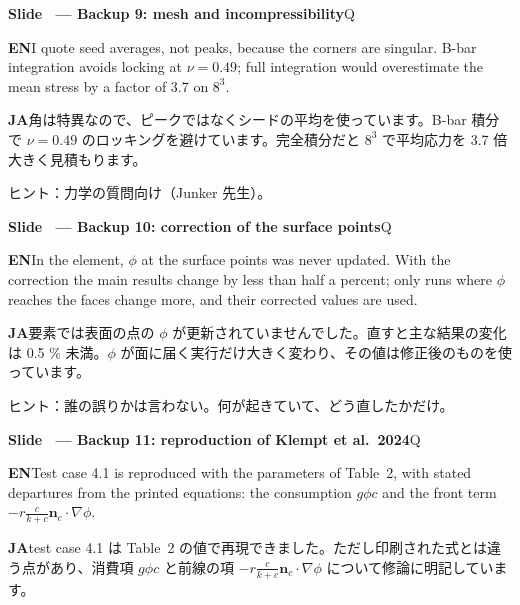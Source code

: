 \documentclass[11pt,a4paper]{article}
\newcounter{sl}
\newcommand{\slide}[2]{\stepcounter{sl}\vspace{8pt}%
  {\color{c3}\large\bfseries Slide \thesl\ --- #1}\hfill{\small #2}\par\vspace{2pt}}
\newcommand{\EN}{\textbf{EN}\quad}
\newcommand{\JA}{\par\textbf{JA}\quad}
\newcommand{\hint}[1]{\par{\color{gray}\small ヒント：#1}}
\begin{document}
\slide{Backup 9: mesh and incompressibility}{Q}
\EN I quote seed averages, not peaks, because the corners are singular. B-bar integration avoids locking at $\nu=0.49$; full integration would overestimate the mean stress by a factor of 3.7 on $8^3$.
\JA 角は特異なので、ピークではなくシードの平均を使っています。B-bar 積分で $\nu=0.49$ のロッキングを避けています。完全積分だと $8^3$ で平均応力を 3.7 倍大きく見積もります。
\hint{力学の質問向け（Junker 先生）。}

\slide{Backup 10: correction of the surface points}{Q}
\EN In the element, $\phi$ at the surface points was never updated. With the correction the main results change by less than half a percent; only runs where $\phi$ reaches the faces change more, and their corrected values are used.
\JA 要素では表面の点の $\phi$ が更新されていませんでした。直すと主な結果の変化は 0.5 \% 未満。$\phi$ が面に届く実行だけ大きく変わり、その値は修正後のものを使っています。
\hint{誰の誤りかは言わない。何が起きていて、どう直したかだけ。}

\slide{Backup 11: reproduction of Klempt et al.\ 2024}{Q}
\EN Test case 4.1 is reproduced with the parameters of Table~2, with stated departures from the printed equations: the consumption $g\phi c$ and the front term $-r\frac{c}{k+c}\mathbf n_c\cdot\nabla\phi$.
\JA test case 4.1 は Table~2 の値で再現できました。ただし印刷された式とは違う点があり、消費項 $g\phi c$ と前線の項 $-r\frac{c}{k+c}\mathbf n_c\cdot\nabla\phi$ について修論に明記しています。
\end{document}
